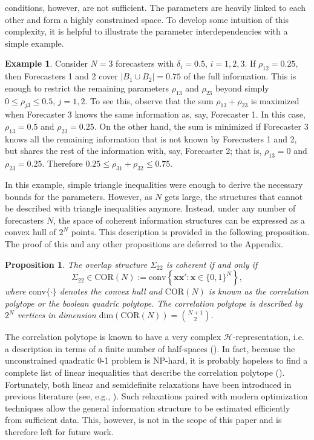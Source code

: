 \documentclass[11pt]{article}
\newtheorem{proposition}[theorem]{Proposition}
\theoremstyle{definition}
\newtheorem{example}[theorem]{Example}
\theoremstyle{definition}
\begin{document}
conditions, however, are not sufficient. The parameters are heavily linked to each other and form a highly constrained space. To develop some intuition of this complexity, it is helpful to illustrate the parameter interdependencies with a simple example. 
\begin{example}
Consider $N = 3$ forecasters with $\delta_i =  0.5$, $i = 1, 2, 3$.  If $\rho_{12} = 0.25$, then Forecasters 1 and 2 cover $|B_1 \cup B_2| = 0.75$ of the full information. This is enough to restrict the remaining parameters $\rho_{13}$ and $\rho_{23}$ beyond simply $0 \leq \rho_{j3} \leq 0.5$, $j = 1, 2$. To see this, observe that the sum $\rho_{13} + \rho_{23}$ is maximized when Forecaster 3 knows the same information as, say, Forecaster 1. In this case, $\rho_{13} = 0.5$ and  $\rho_{23} = 0.25$. On the other hand, the sum is minimized if Forecaster 3 knows all the remaining information that is not known by Forecasters 1 and 2, but shares the rest of the information with, say, Forecaster 2; that is, $\rho_{13} = 0$ and $\rho_{23} = 0.25$. Therefore  $0.25 \leq \rho_{31} + \rho_{32} \leq 0.75$. 
\end{example}
In this example, simple triangle inequalities were enough to derive the necessary bounds for the parameters. However, as $N$ gets large, the structures that cannot be described with triangle inequalities anymore. Instead, under any number of forecasters $N$, the space of coherent information structures can be expressed as a convex hull of $2^N$ points. This description is provided in the following proposition. The proof of this and any other propositions are deferred to the Appendix.

\begin{proposition}
\label{CorrelationPolytope}
The overlap structure $\Sigma_{22}$ is coherent if and only
if $$\Sigma_{22} \in \text{COR}(N) := \text{conv}\left\{
\boldsymbol{x}\boldsymbol{x}' : \boldsymbol{x} \in
\{0,1\}^N\right\},$$ where $\text{conv}\{\cdot\}$ denotes the convex hull and $\text{COR}(N)$ is known as the correlation
polytope or the boolean quadric polytope. The correlation polytope is described by $2^N$
vertices in dimension $\text{dim}(\text{COR}(N)) = \binom{N+1}{2}$.
\end{proposition}
The correlation polytope is known to have a very complex
$\mathcal{H}$-representation, i.e. a description in terms of a finite
number of half-spaces (\citealt{padberg1989boolean, ziegler2000lectures}). In fact, because the unconstrained quadratic
0-1 problem is NP-hard, it is probably hopeless to find a complete
list of linear inequalities that describe the correlation polytope
(\citealt{deza1997geometry}). Fortunately, both linear and semidefinite relaxations have been introduced in previous literature (see, e.g., \citealt{laurent1997connections}). Such relaxations paired with modern optimization techniques allow the general information structure to be estimated efficiently from sufficient data. This, however, is not in the scope of this paper and is therefore left for future work. 
\end{document}
